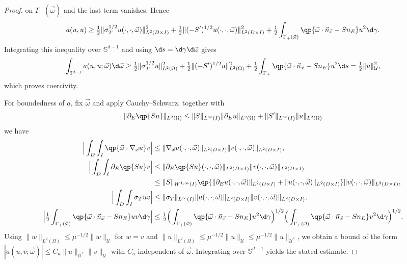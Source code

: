 \documentclass[final]{amsart}
\begin{document}
\begin{proof}
on $\Gamma_-(\vec\omega)$ and the last term vanishes. Hence
\begin{equation*}
  a(u,u)
  \ge
  \tfrac{1}{2}\|\sigma_T^{1/2}u(\cdot,\cdot,\vec\omega)\|_{L^2(D\times I)}^2
  + \tfrac{1}{2}\|(-S')^{1/2}u(\cdot,\cdot,\vec\omega)\|_{L^2(D\times I)}^2
  + \tfrac{1}{2}\int_{\Gamma_+(\vec\omega)}\qp{\vec{\omega}\cdot\vec{n}_{\vec x} - S n_E} u^2 \d\gamma.
\end{equation*}
Integrating this inequality over $\mathbb{S}^{d-1}$ and using $\d
s=\d\gamma \d\vec\omega$ gives
\begin{equation*}
  \int_{\mathbb{S}^{d-1}} a(u,u;\vec{\omega}) \d\vec{\omega}
  \ge
  \tfrac{1}{2}\|\sigma_T^{1/2}u\|_{L^2(\Omega)}^2
  + \tfrac{1}{2}\|(-S')^{1/2}u\|_{L^2(\Omega)}^2
  + \tfrac{1}{2}\int_{\Gamma_+}\qp{\vec{\omega}\cdot\vec{n}_{\vec x} - S n_E} u^2 \d s
  =
  \tfrac{1}{2}\|u\|_{\mathcal{U}}^2,
\end{equation*}
which proves coercivity.

For boundedness of $a$, fix $\vec{\omega}$ and apply Cauchy--Schwarz,
together with
\[
\|\partial_E\qp{S u}\|_{L^2(\Omega)}\le \|S\|_{L^\infty(I)}\|\partial_E u\|_{L^2(\Omega)} + \|S'\|_{L^\infty(I)}\|u\|_{L^2(\Omega)}
\]
we have
\begin{align*}
  \Big|\int_D\int_I \qp{\vec{\omega}\cdot\nabla_{\vec x} u} v\Big|
  &\le
  \|\nabla_{\vec x} u(\cdot,\cdot,\vec\omega)\|_{L^2(D\times I)}\|v(\cdot,\cdot,\vec\omega)\|_{L^2(D\times I)},\\
  \Big|\int_D\int_I \partial_E\qp{S u} v\Big|
  &\le
  \|\partial_E\qp{S u}(\cdot,\cdot,\vec\omega)\|_{L^2(D\times I)}\|v(\cdot,\cdot,\vec\omega)\|_{L^2(D\times I)}\\
  &\le
  \|S\|_{W^{1,\infty}(I)}\qp{\|\partial_E u(\cdot,\cdot,\vec\omega)\|_{L^2(D\times I)}+\|u(\cdot,\cdot,\vec\omega)\|_{L^2(D\times I)}}\|v(\cdot,\cdot,\vec\omega)\|_{L^2(D\times I)},\\
  \Big|\int_D\int_I \sigma_T u v\Big|
  &\le
  \|\sigma_T\|_{L^\infty(I)}\|u(\cdot,\cdot,\vec\omega)\|_{L^2(D\times I)}\|v(\cdot,\cdot,\vec\omega)\|_{L^2(D\times I)},\\
  \Big|\tfrac{1}{2}\int_{\Gamma_+(\vec\omega)}\qp{\vec{\omega}\cdot\vec{n}_{\vec x} - S n_E} u v \d\gamma\Big|
  &\le
  \tfrac{1}{2}
  \Big(\int_{\Gamma_+(\vec\omega)}\qp{\vec{\omega}\cdot\vec{n}_{\vec x} - S n_E} u^2 \d\gamma\Big)^{1/2}
  \Big(\int_{\Gamma_+(\vec\omega)}\qp{\vec{\omega}\cdot\vec{n}_{\vec x} - S n_E} v^2 \d\gamma\Big)^{1/2}.
\end{align*}
Using $\|w\|_{L^2(\Omega)}\le \mu^{-1/2}\|w\|_{\mathcal{U}}$ for $w=v$ and
$\|u\|_{L^2(\Omega)}\le \mu^{-1/2}\|u\|_{\mathcal{U}}\le \mu^{-1/2}\|u\|_{\mathcal{U}^*}$,
we obtain a bound of the form
$|a(u,v;\vec{\omega})|\le C_a\|u\|_{\mathcal{U}^*}\|v\|_{\mathcal{U}}$ with $C_a$ independent of $\vec{\omega}$.
Integrating over $\mathbb{S}^{d-1}$ yields the stated estimate.


\end{proof}
\end{document}

